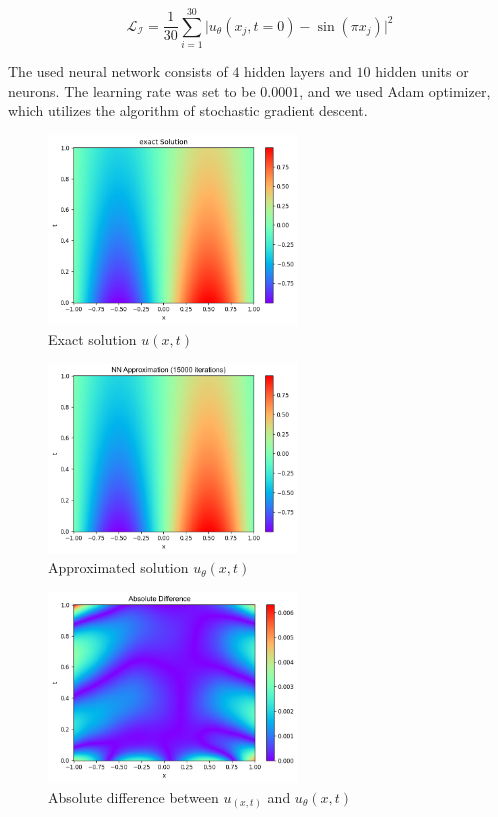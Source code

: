 \documentclass[a4paper,12pt]{article}
\theoremstyle{definition}
\begin{document}
$$
\mathcal{L}_{\mathcal{I}} = \frac{1}{30} \sum_{i=1}^{30}
\Bigg| u_\theta(x_j, t=0) - \sin(\pi x_j) \Bigg|^2
$$

The used neural network consists of $4$ hidden layers and $10$ hidden units or neurons.
The learning rate was set to be $0.0001$, and we used Adam optimizer, which utilizes the 
algorithm of stochastic gradient descent. 

\begin{figure}[H]
    \centering
    \includegraphics[width=250px]{images/exact_solution_diff.png}
    \vspace{-1em}
    \caption{Exact solution $u(x,t)$}
    \label{exact diff}
\end{figure}

\begin{figure}[H]
    \centering
    \includegraphics[width=250px]{images/approx_solution_diff.png}
    \vspace{-1em}
    \caption{Approximated solution $u_\theta(x,t)$}
    \label{approximation diff}
\end{figure}

\begin{figure}[H]
    \centering
    \includegraphics[width=250px]{images/difference_diff.png}
    \vspace{-1em}
    \caption{Absolute difference between $u_(x,t)$ and $u_\theta(x,t)$}
    \label{absolute diff}
\end{figure}
\end{document}

